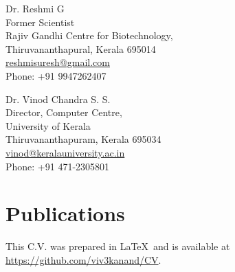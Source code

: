 \documentclass[a4paper, 10pt]{article}
\begin{document}
\begin{minipage}[ht]{.50\textwidth}
Dr. Reshmi G \\
Former Scientist \\
Rajiv Gandhi Centre for Biotechnology, \\
Thiruvananthapural, Kerala 695014 \\
\href{mailto:reshmisuresh@gmail.com}{reshmisuresh@gmail.com} \\
Phone: +91 9947262407
\end{minipage}
\begin{minipage}[ht]{.50\textwidth}
Dr. Vinod Chandra S. S. \\
Director, Computer Centre, \\
University of Kerala \\
Thiruvananthapuram, Kerala 695034\\
\href{mailto:vinod@keralauniversity.ac.in}{vinod@keralauniversity.ac.in} \\
Phone: +91 471-2305801
\end{minipage}

\section*{Publications}
\begingroup
   \renewcommand{\section}[2]{}
   
   \nocite{*}
   
\endgroup

\vfill

\footnotesize
This C.V. was prepared in \LaTeX\ and is available at \href{https://github.com/viv3kanand/CV}{https://github.com/viv3kanand/CV}.
\end{document}
